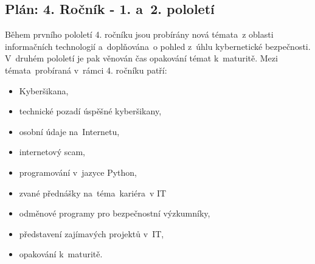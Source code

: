 \documentclass[a4paper, 12pt]{article}
\begin{document}
\subsection{Plán: 4. Ročník - 1. a~2. pololetí}
Během prvního pololetí 4. ročníku jsou probírány nová témata~z oblasti informačních technologií a~doplňována~o pohled z~úhlu kybernetické bezpečnosti. V~druhém pololetí je pak věnován čas opakování témat k~maturitě. Mezi témata~probíraná v~rámci 4. ročníku patří:
\begin{itemize}
    \setlength{\itemsep}{-3pt}
    \item Kyberšikana,
    \item technické pozadí úspěšné kyberšikany,
    \item osobní údaje na~Internetu,
    \item internetový scam, 
    \item programování v~jazyce Python,
    \item zvané přednášky na~téma~kariéra~v IT
    \item odměnové programy pro bezpečnostní výzkumníky,
    \item představení zajímavých projektů v~IT,
    \item opakování k~maturitě.
\end{itemize}



\end{document}
